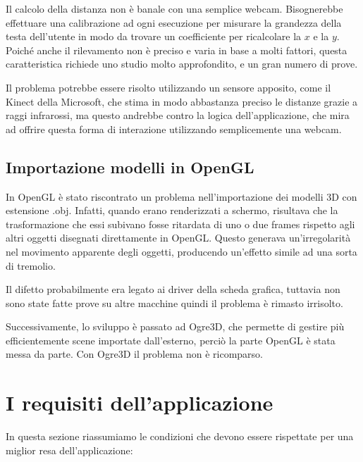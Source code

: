 Il calcolo della distanza non è banale con una semplice webcam. Bisognerebbe effettuare una calibrazione ad ogni esecuzione per misurare la grandezza della testa dell'utente in modo da trovare un coefficiente per ricalcolare la $x$ e la $y$. Poiché anche il rilevamento non è preciso e varia in base a molti fattori, questa caratteristica richiede uno studio molto approfondito, e un gran numero di prove.

Il problema potrebbe essere risolto utilizzando un sensore apposito, come il Kinect della Microsoft, che stima in modo abbastanza preciso le distanze grazie a raggi infrarossi, ma questo andrebbe contro la logica dell'applicazione, che mira ad offrire questa forma di interazione utilizzando semplicemente una webcam.

\subsection{Importazione modelli in OpenGL}
In OpenGL è stato riscontrato un problema nell'importazione dei modelli 3D con estensione .obj. Infatti, quando erano renderizzati a schermo, risultava che la trasformazione che essi subivano fosse ritardata di uno o due frames rispetto agli altri oggetti disegnati direttamente in OpenGL. Questo generava un'irregolarità nel movimento apparente degli oggetti, producendo un'effetto simile ad una sorta di tremolio.

Il difetto probabilmente era legato ai driver della scheda grafica, tuttavia non sono state fatte prove su altre macchine quindi il problema è rimasto irrisolto.

Successivamente, lo sviluppo è passato ad Ogre3D, che permette di gestire più efficientemente scene importate dall'esterno, perciò la parte OpenGL è stata messa da parte. Con Ogre3D il problema non è ricomparso.



\section{I requisiti dell'applicazione}
In questa sezione riassumiamo le condizioni che devono essere rispettate per una miglior resa dell'applicazione:


